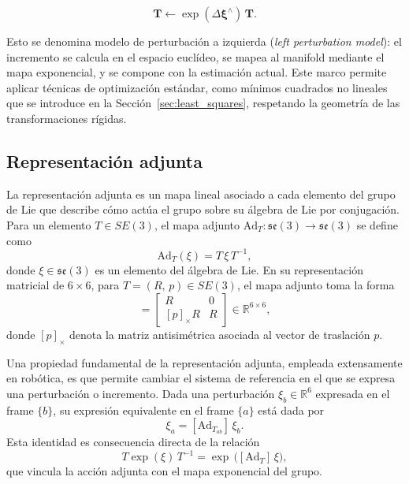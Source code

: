 \[
\mathbf{T} \leftarrow \exp(\Delta\boldsymbol{\xi}^{\wedge})\,\mathbf{T}.
\]

Esto se denomina modelo de perturbación a izquierda (\textit{left perturbation model}): el incremento se calcula en el espacio euclídeo, se mapea al manifold mediante el mapa exponencial, y se compone con la estimación actual. Este marco permite aplicar técnicas de optimización estándar, como mínimos cuadrados no lineales que se introduce en la Sección~\ref{sec:least_squares}, respetando la geometría de las transformaciones rígidas.

\subsection{Representación adjunta}

La representación adjunta es un mapa lineal asociado a cada elemento del grupo de Lie que describe cómo actúa el grupo sobre su álgebra de Lie por conjugación. Para un elemento $T \in SE(3)$, el mapa adjunto $\mathrm{Ad}_T : \mathfrak{se}(3) \to \mathfrak{se}(3)$ se define como
%
\begin{equation}
    \mathrm{Ad}_T(\xi) = T\,\xi\,T^{-1},
\end{equation}
%
donde $\xi \in \mathfrak{se}(3)$ es un elemento del álgebra de Lie. En su representación matricial de $6\times6$, para $T = (R,\,p) \in SE(3)$, el mapa adjunto toma la forma~\cite{Lynch2017}
%
\begin{equation}
    [\mathrm{Ad}_T] =
    \begin{bmatrix}
        R          & 0 \\
        [p]_\times R & R
    \end{bmatrix}
    \in \mathbb{R}^{6\times6},
\end{equation}
%
donde $[p]_\times$ denota la matriz antisimétrica asociada al vector de traslación $p$.

Una propiedad fundamental de la representación adjunta, empleada extensamente en robótica, es que permite cambiar el sistema de referencia en el que se expresa una perturbación o incremento. Dada una perturbación $\xi_b \in \mathbb{R}^6$ expresada en el frame $\{b\}$, su expresión equivalente en el frame $\{a\}$ está dada por~\cite{Lynch2017}
%
\begin{equation}
    \xi_a = [\mathrm{Ad}_{T_{ab}}]\,\xi_b.
    \label{eq:adjoint_twist}
\end{equation}
%
Esta identidad es consecuencia directa de la relación
%
\begin{equation}
    T\exp(\xi)\,T^{-1} = \exp\,\bigl([\mathrm{Ad}_T]\,\xi\bigr),
\end{equation}
%
que vincula la acción adjunta con el mapa exponencial del grupo.

